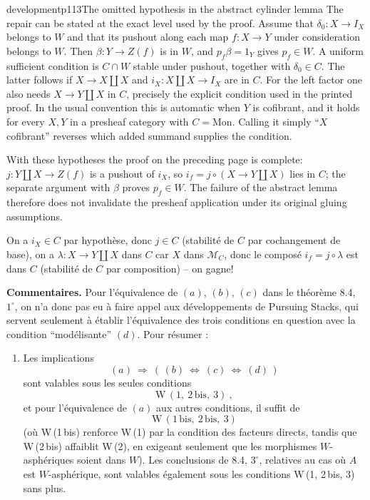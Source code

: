\begin{dcomment}{development}{p113}{The omitted hypothesis in the abstract cylinder lemma}
The repair can be stated at the exact level used by the proof. Assume that $\delta_0:X\to I_X$ belongs to $W$ and that its pushout along each map $f:X\to Y$ under consideration belongs to $W$. Then $\beta:Y\to Z(f)$ is in $W$, and $p_f\beta=1_Y$ gives $p_f\in W$. A uniform sufficient condition is $C\cap W$ stable under pushout, together with $\delta_0\in C$. The latter follows if $X\to X\amalg X$ and $i_X:X\amalg X\to I_X$ are in $C$. For the left factor one also needs $X\to Y\amalg X$ in $C$, precisely the explicit condition used in the printed proof. In the usual convention this is automatic when $Y$ is cofibrant, and it holds for every $X,Y$ in a presheaf category with $C=\mathrm{Mon}$. Calling it simply ``$X$ cofibrant'' reverses which added summand supplies the condition.

With these hypotheses the proof on the preceding page is complete: $j:Y\amalg X\to Z(f)$ is a pushout of $i_X$, so $i_f=j\circ(X\to Y\amalg X)$ lies in $C$; the separate argument with $\beta$ proves $p_f\in W$. The failure of the abstract lemma therefore does not invalidate the presheaf application under its original gluing assumptions.
\end{dcomment}


On a $i_X \in C$ par hypothèse, donc $j \in C$ (stabilité de $C$ par cochangement de base), on a $\lambda : X \longrightarrow Y \amalg X$ dans $C$ car $X$ dans $\mathcal{M}_C$, donc le composé $i_f = j \circ \lambda$ est dans $C$ (stabilité de $C$ par composition) – on gagne!

\textbf{Commentaires.} Pour l'équivalence de $(a)$, $(b)$, $(c)$ dans le théorème 8.4, $1^\circ$, on n'a donc pas eu à faire appel aux développements de Pursuing Stacks, qui servent seulement à établir l'équivalence des trois conditions en question avec la condition “modélisante” $(d)$. Pour résumer :
\begin{enumerate}[leftmargin=2.5em]
\item[$1^\circ$)] Les implications
\[
(a) \ \Longrightarrow\ (\,(b) \ \Longleftrightarrow\ (c) \ \Longleftrightarrow\ (d)\,)
\]
sont valables sous les seules conditions
\[
\mathrm{W}\,(1,\ 2\,\mathrm{bis},\ 3)\ ,
\]
et pour l'équivalence de $(a)$ aux autres conditions, il suffit de
\[
\mathrm{W}\,(1\,\mathrm{bis},\ 2\,\mathrm{bis},\ 3)
\]
(où W\,(1\,bis) renforce W\,(1) par la condition des facteurs directs, tandis que W\,(2\,bis) affaiblit W\,(2), en exigeant seulement que les morphismes $W$-asphériques soient dans $W$). Les conclusions de 8.4, $3^\circ$, relatives au cas où $A$ est $W$-asphérique, sont valables également sous les conditions W\,(1, 2\,bis, 3) sans plus.
\end{enumerate}

